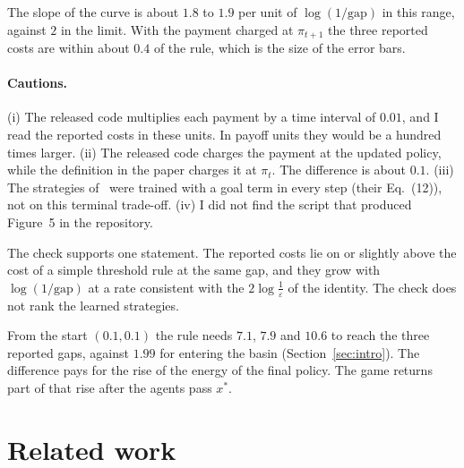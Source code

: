 \documentclass[11pt,a4paper]{article}
\theoremstyle{definition}
\theoremstyle{plain}
\newcommand{\xs}{x^{*}}
\begin{document}
The slope of the curve is about $1.8$ to $1.9$ per unit of $\log(1/\text{gap})$ in this range, against $2$ in the limit. With the payment charged at $\pi_{t+1}$ the three reported costs are within about $0.4$ of the rule, which is the size of the error bars.

\paragraph{Cautions.}
(i) The released code multiplies each payment by a time interval of $0.01$, and I read the reported costs in these units. In payoff units they would be a hundred times larger. (ii) The released code charges the payment at the updated policy, while the definition in the paper charges it at $\pi_t$. The difference is about $0.1$. (iii) The strategies of~\cite{huang2025} were trained with a goal term in every step (their Eq.~(12)), not on this terminal trade-off. (iv) I did not find the script that produced Figure~5 in the repository.

The check supports one statement. The reported costs lie on or slightly above the cost of a simple threshold rule at the same gap, and they grow with $\log(1/\text{gap})$ at a rate consistent with the $2\log\frac1\varepsilon$ of the identity. The check does not rank the learned strategies.

From the start $(0.1,0.1)$ the rule needs $7.1$, $7.9$ and $10.6$ to reach the three reported gaps, against $1.99$ for entering the basin (Section~\ref{sec:intro}). The difference pays for the rise of the energy of the final policy. The game returns part of that rise after the agents pass $\xs$.

\section{Related work}\label{sec:related}
\end{document}
